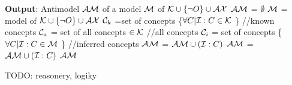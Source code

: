 \begin{algorithm}[t!]
\begin{algorithmic}[1]
%		
%		
		\EndFunction
    \end{algorithmic}
\end{algorithm}
   \begin{algorithm}[t!]
    \begin{algorithmic}[1]
			\State \textbf{Output}: Antimodel  $\mathcal{AM}$ of a model $\mathcal{M}$ of $\mathcal{K} \cup \{\neg O\} \cup \mathcal{AX}$ 
			\State $\mathcal{AM}$ = $\emptyset$
			\State $\mathcal{M}$ = model of $\mathcal{K} \cup \{\neg O\} \cup \mathcal{AX}$ 
				\State $\mathcal{C} _k$ =set of concepts \{$\forall C  | {\mathcal{I} : C} \in \mathcal{K} $ \} //known concepts   
				\State $\mathcal{C} _a$ = set of all concepts $\in \mathcal{K}$ //all concepts
				\State $\mathcal{C} _i$ = set of concepts \{$ \forall C | {\mathcal{I} : C} \in \mathcal{M} $ \} //inferred concepts
						\State $\mathcal{AM}$ = $\mathcal{AM} \cup (\mathcal{I} : C)$
					\EndIf
				\EndFor
						\State $\mathcal{AM}$ = $\mathcal{AM} \cup (\mathcal{I} : C)$
					\EndIf
				\EndFor
			\EndFor
		\State \Return $\mathcal{AM}$
 	\EndFunction
    \end{algorithmic}
\end{algorithm}




TODO: reasonery, logiky